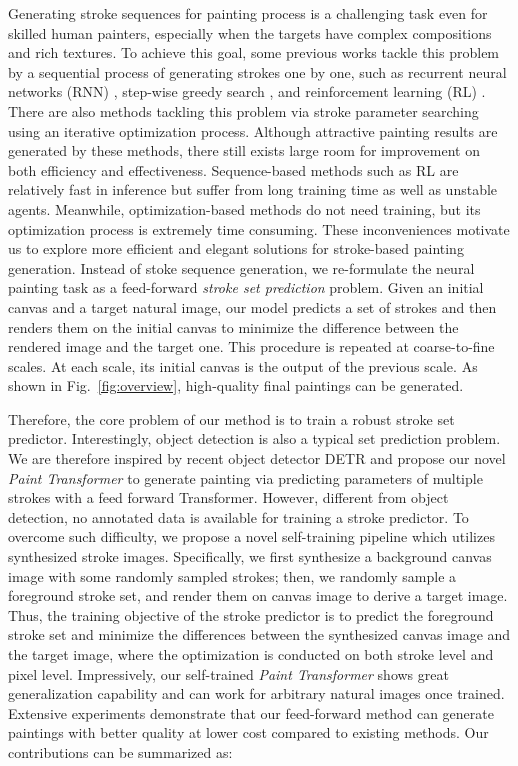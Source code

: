 \documentclass[10pt,twocolumn,letterpaper]{article}
\begin{document}
Generating stroke sequences for painting process is a challenging task even for skilled human painters, especially when the targets have complex compositions and rich textures.
To achieve this goal, some previous works tackle this problem by a sequential process of generating strokes one by one, such as recurrent neural networks (RNN) \cite{zheng2018strokenet,ha2017neural}, step-wise greedy search \cite{haeberli1990paint,litwinowicz1997processing}, and reinforcement learning (RL) \cite{ganin2018synthesizing,zhou2018learning,xie2013artist,huang2019learning,nakano2019neural}.
There are also methods \cite{zou2020stylized,kotovenko_cvpr_2021} tackling this problem via stroke parameter searching using an iterative optimization process.
Although attractive painting results are generated by these methods, there still exists large room for improvement on both efficiency and effectiveness. Sequence-based methods such as RL are relatively fast in inference but suffer from long training time as well as unstable agents. Meanwhile, optimization-based methods \cite{zou2020stylized,kotovenko_cvpr_2021} do not need training, but its optimization process is extremely time consuming. 
These inconveniences motivate us to explore more efficient and elegant solutions for stroke-based painting generation.
Instead of stoke sequence generation, we re-formulate the neural painting task as a feed-forward \emph{stroke set prediction} problem. 
Given an initial canvas and a target natural image, our model predicts a set of strokes and then renders them on the initial canvas to minimize the difference between the rendered image and the target one. This procedure is repeated at  coarse-to-fine scales. At each scale, its initial canvas is the output of the previous scale. As shown in Fig.~\ref{fig:overview}, high-quality final paintings can be generated.




Therefore, the core problem of our method is to train a robust stroke set predictor. 
Interestingly, object detection is also a typical set prediction problem. We are therefore inspired by recent object detector DETR \cite{carion2020endtoend} and propose our novel \textit{Paint Transformer} to generate painting via predicting parameters of multiple strokes with a feed forward Transformer.
However, different from object detection, no annotated data is available for training a stroke predictor.
To overcome such difficulty, we propose a novel self-training pipeline which utilizes synthesized stroke images. Specifically, we first synthesize a background canvas image with some randomly sampled strokes; then, we randomly sample a foreground stroke set, and render them on canvas image to derive a target image.
Thus, the training objective of the stroke predictor is to predict the foreground stroke set and minimize the differences between the synthesized canvas image and the target image, where the optimization is conducted on both stroke level and pixel level.
Impressively, our self-trained \emph{Paint Transformer} shows great generalization capability and can work for arbitrary natural images once trained.
Extensive experiments demonstrate that our feed-forward method can generate paintings with better quality at lower cost compared to existing methods.
Our contributions can be summarized as:
\end{document}
